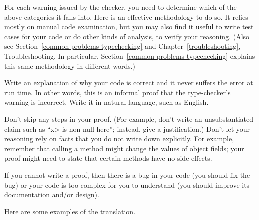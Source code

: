 For each warning issued by the checker, you need to determine which of the
above categories it falls into.  Here is an effective methodology to do so.
It relies mostly on manual code examination, but you may also find it
useful to write test cases for your code or do other kinds of analysis, to
verify your reasoning.
(Also see
Section~\ref{common-problems-typechecking} and
Chapter~\ref{troubleshooting}, Troubleshooting.
In particular, Section~\ref{common-problems-typechecking} explains this
same methodology in different words.)


Write an explanation of why your code is correct and it
never suffers the error at run time.  In other words, this is an informal proof
that the type-checker's warning is incorrect.  Write it in natural language,
such as English.

Don't skip any steps in your proof.
(For example, don't write an unsubstantiated claim such as ``\<x> is
non-null here''; instead, give a justification.)
Don't let your reasoning rely on
facts that you do not write down explicitly.  For example, remember that
calling a method might change the values of object fields; your proof
might need to state that certain methods have no side effects.

If you cannot write a proof, then there is a bug
in your code (you should fix the bug) or your code is too complex for you
to understand (you should improve its documentation and/or design).


Here are some examples of the translation.

